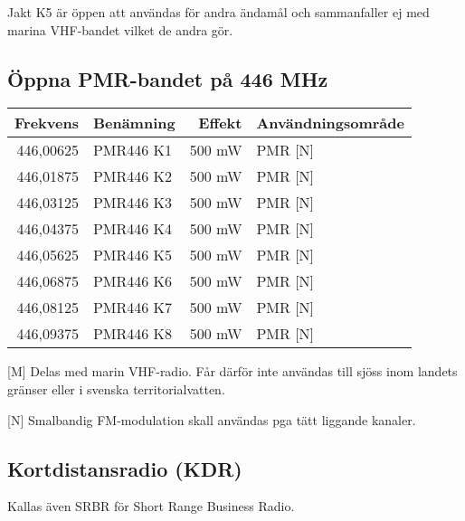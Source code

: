 \documentclass[10pt,swedish,a4paper,twoside]{article}
\begin{document}
Jakt K5 är öppen att användas för andra ändamål och sammanfaller ej med marina VHF-bandet vilket de andra gör.


\subsection{Öppna PMR-bandet på 446 MHz}
\begin{tabular}{rlrl}
	\textbf{Frekvens} & \textbf{Benämning} & \textbf{Effekt} & \textbf{Användningsområde} \\ \hline
	        446,00625 & PMR446 K1          &          500 mW & PMR [N]                    \\
	        446,01875 & PMR446 K2          &          500 mW & PMR [N]                    \\
	        446,03125 & PMR446 K3          &          500 mW & PMR [N]                    \\
	        446,04375 & PMR446 K4          &          500 mW & PMR [N]                    \\
	        446,05625 & PMR446 K5          &          500 mW & PMR [N]                    \\
	        446,06875 & PMR446 K6          &          500 mW & PMR [N]                    \\
	        446,08125 & PMR446 K7          &          500 mW & PMR [N]                    \\
	        446,09375 & PMR446 K8          &          500 mW & PMR [N]
\end{tabular}

[M] Delas med marin VHF-radio. Får därför inte användas till sjöss inom landets gränser eller i svenska territorialvatten.

[N] Smalbandig FM-modulation skall användas pga tätt liggande kanaler.

\subsection{Kortdistansradio (KDR)}

Kallas även SRBR för Short Range Business Radio.
\end{document}
